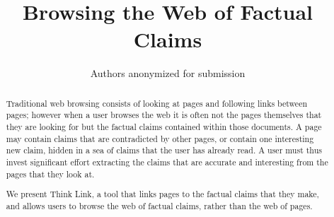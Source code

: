 \documentclass{chi2009}
\begin{document}
\setlength{\paperheight}{11in}
\setlength{\paperwidth}{8.5in}
\setlength{\pdfpageheight}{\paperheight}
\setlength{\pdfpagewidth}{\paperwidth}
%

\title{Browsing the Web of Factual Claims}


\author{
	\alignauthor Authors anonymized for submission
}


\sloppy 

\maketitle

\begin{abstract}

Traditional web browsing consists of looking at pages and following links between pages; however when a user browses the web it is often not the pages themselves that they are looking for but the factual claims contained within those documents. A page may contain claims that are contradicted by other pages, or contain one interesting new claim, hidden in a sea of claims that the user has already read. A user must thus invest significant effort extracting the claims that are accurate and interesting from the pages that they look at.

We present Think Link, a tool that links pages to the factual claims that they make, and allows users to browse the web of factual claims, rather than the web of pages. 

\end{abstract}

\end{document}
